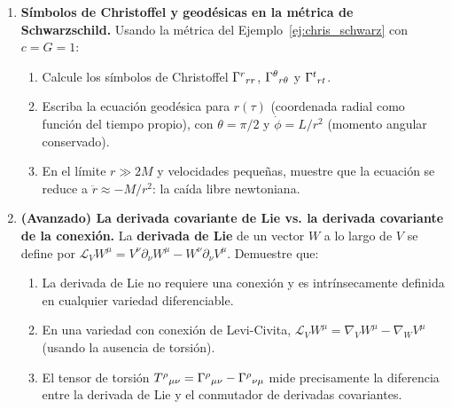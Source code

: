 \begin{enumerate}[leftmargin=2em, label=\textbf{P\thechapter.\arabic*.}]
  \item \textbf{Símbolos de Christoffel y geodésicas en la métrica de Schwarzschild.}
  Usando la métrica del Ejemplo~\ref{ej:chris_schwarz} con $c = G = 1$:
  \begin{enumerate}[label=(\alph*)]
    \item Calcule los símbolos de Christoffel $\Gamma^{r}{}_{r r}$, $\Gamma^{\theta}{}_{r \theta}$ y $\Gamma^{t}{}_{r t}$.
    \item Escriba la ecuación geodésica para $r(\tau)$ (coordenada radial como función del tiempo propio), con $\theta = \pi/2$ y $\dot{\phi} = L/r^2$ (momento angular conservado).
    \item En el límite $r \gg 2M$ y velocidades pequeñas, muestre que la ecuación se reduce a $\ddot{r} \approx -M/r^2$: la caída libre newtoniana.
  \end{enumerate}

  \item \textbf{(Avanzado) La derivada covariante de Lie vs. la derivada covariante de la conexión.}
  La \textbf{derivada de Lie} de un vector $W$ a lo largo de $V$ se define por $\mathcal{L}_V W^\mu = V^\nu\partial_\nu W^\mu - W^\nu\partial_\nu V^\mu$. Demuestre que:
  \begin{enumerate}[label=(\alph*)]
    \item La derivada de Lie no requiere una conexión y es intrínsecamente definida en cualquier variedad diferenciable.
    \item En una variedad con conexión de Levi-Civita, $\mathcal{L}_V W^\mu = \nabla_V W^\mu - \nabla_W V^\mu$ (usando la ausencia de torsión).
    \item El tensor de torsión $T^\rho{}_{\mu\nu} = \Gamma^{\rho}{}_{\mu \nu} - \Gamma^{\rho}{}_{\nu \mu}$ mide precisamente la diferencia entre la derivada de Lie y el conmutador de derivadas covariantes.
  \end{enumerate}

\end{enumerate}

